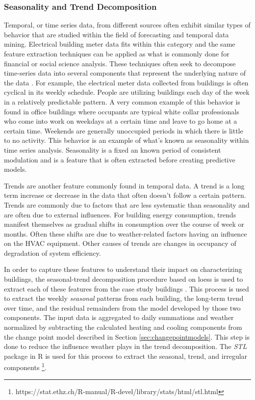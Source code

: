 \subsubsection{Seasonality and Trend Decomposition}
\label{sec:seasonaldecomposition}

Temporal, or time series data, from different sources often exhibit similar types of behavior that are studied within the field of forecasting and temporal data mining. Electrical building meter data fits within this category and the same feature extraction techniques can be applied as what is commonly done for financial or social science analysis. These techniques often seek to decompose time-series data into several components that represent the underlying nature of the data \cite{Mitsa_2010}. For example, the electrical meter data collected from buildings is often cyclical in its weekly schedule. People are utilizing buildings each day of the week in a relatively predictable pattern. A very common example of this behavior is found in office buildings where occupants are typical white collar professionals who come into work on weekdays at a certain time and leave to go home at a certain time. Weekends are generally unoccupied periods in which there is little to no activity. This behavior is an example of what's known as seasonality within time series analysis. Seasonality is a fixed an known period of consistent modulation and is a feature that is often extracted before creating predictive models. 

Trends are another feature commonly found in temporal data. A trend is a long term increase or decrease in the data that often doesn't follow a certain pattern. Trends are commonly due to factors that are less systematic than seasonality and are often due to external influences. For building energy consumption, trends manifest themselves as gradual shifts in consumption over the course of week or months. Often these shifts are due to weather-related factors having an influence on the HVAC equipment. Other causes of trends are changes in occupancy of degradation of system efficiency. 

In order to capture these features to understand their impact on characterizing buildings, the seasonal-trend decomposition procedure based on loess is used to extract each of these features from the case study buildings \cite{cleveland1990stl}. This process is used to extract the weekly \emph{seasonal} patterns from each building, the long-term trend over time, and the residual remainders from the model developed by those two components. The input data is aggregated to daily summations and weather normalized by subtracting the calculated heating and cooling components from the change point model described in Section \ref{sec:changepointmodels}. This step is done to reduce the influence weather plays in the trend decomposition. The \emph{STL} package in R is used for this process to extract the seasonal, trend, and irregular components \footnote{https://stat.ethz.ch/R-manual/R-devel/library/stats/html/stl.html}. 

